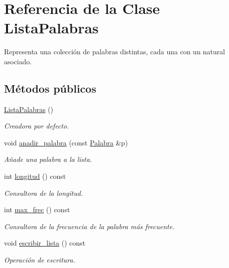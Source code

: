 \hypertarget{class_lista_palabras}{\section{Referencia de la Clase Lista\-Palabras}
\label{class_lista_palabras}
}


Representa una colección de palabras distintas, cada una con un natural asociado.  


\subsection*{Métodos públicos}
\begin{DoxyCompactItemize}
\item 
\hyperlink{class_lista_palabras_ae0d9e5a9aa149270056f47d272f36460}{Lista\-Palabras} ()
\begin{DoxyCompactList}\small\item\em Creadora por defecto. \end{DoxyCompactList}\item 
void \hyperlink{class_lista_palabras_a1321849c60c36bd29208103984a37192}{anadir\-\_\-palabra} (const \hyperlink{class_palabra}{Palabra} \&p)
\begin{DoxyCompactList}\small\item\em Añade una palabra a la lista. \end{DoxyCompactList}\item 
int \hyperlink{class_lista_palabras_ad593a5988b7ec974e9621e8cd26e0e06}{longitud} () const 
\begin{DoxyCompactList}\small\item\em Consultora de la longitud. \end{DoxyCompactList}\item 
int \hyperlink{class_lista_palabras_aaafa09ef438a8ee956d2c1a095e578f4}{max\-\_\-frec} () const 
\begin{DoxyCompactList}\small\item\em Consultora de la frecuencia de la palabra más frecuente. \end{DoxyCompactList}\item 
void \hyperlink{class_lista_palabras_ac4d573f9174b86d307dfb06af8db5e1f}{escribir\-\_\-lista} () const 
\begin{DoxyCompactList}\small\item\em Operación de escritura. \end{DoxyCompactList}\end{DoxyCompactItemize}
